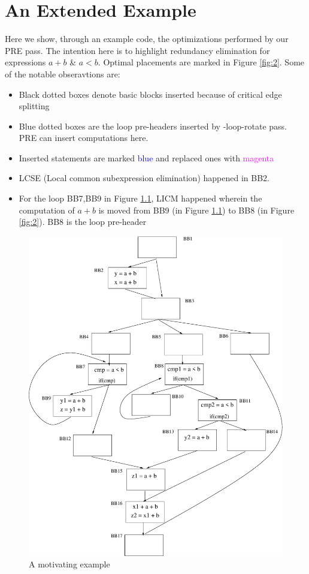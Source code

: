\chapter{An Extended Example}

Here we show, through an example code, the optimizations performed
by our PRE pass. The intention here is to highlight redundancy elimination for  
expressions $a + b$ \& $a < b$. Optimal placements are marked in Figure \ref{fig:2}.
Some of the notable obseravtions are:
\begin{itemize}
\item Black dotted boxes denote basic blocks inserted because of critical edge splitting
\item  Blue dotted boxes are the loop pre-headers inserted
      by -loop-rotate pass. PRE can insert computations here.
\item Inserted statements are marked \textcolor{blue}{blue} and replaced ones with
      \textcolor{magenta}{magenta}      
\item LCSE (Local common subexpression elimination)  happened in BB2.
\item For the loop {BB7,BB9} in Figure \ref{fig:1}, LICM happened wherein the computation 
of $a+b$ is moved from BB9 (in Figure  \ref{fig:1}) to BB8 (in Figure \ref{fig:2}). BB8 is the loop pre-header
\end{itemize}


\begin{figure}[htbp]
  \begin{center}
     \includegraphics[scale=0.3]{Figs/1} 
  \end{center}
  \caption{A motivating example}
    \label{fig:1} 
\end{figure}


